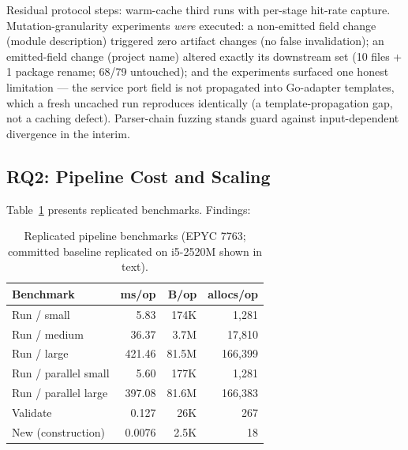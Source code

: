 \documentclass[sigconf,nonacm]{acmart}
\begin{document}
Residual protocol steps: warm-cache third runs with per-stage hit-rate capture. Mutation-granularity experiments \emph{were} executed: a non-emitted field change (module description) triggered zero artifact changes (no false invalidation); an emitted-field change (project name) altered exactly its downstream set (10 files + 1 package rename; 68/79 untouched); and the experiments surfaced one honest limitation --- the service port field is not propagated into Go-adapter templates, which a fresh uncached run reproduces identically (a template-propagation gap, not a caching defect). Parser-chain fuzzing stands guard against input-dependent divergence in the interim.

\subsection{RQ2: Pipeline Cost and Scaling}
Table~\ref{tab:bench} presents replicated benchmarks. Findings:

\begin{table}[t]
\centering
\caption{Replicated pipeline benchmarks (EPYC 7763; committed baseline replicated on i5-2520M shown in text).}
\label{tab:bench}
\small
\begin{tabular}{@{}lrrr@{}}
\toprule
\textbf{Benchmark} & \textbf{ms/op} & \textbf{B/op} & \textbf{allocs/op}\\
\midrule
Run / small & 5.83 & 174K & 1{,}281\\
Run / medium & 36.37 & 3.7M & 17{,}810\\
Run / large & 421.46 & 81.5M & 166{,}399\\
Run / parallel small & 5.60 & 177K & 1{,}281\\
Run / parallel large & 397.08 & 81.6M & 166{,}383\\
Validate & 0.127 & 26K & 267\\
New (construction) & 0.0076 & 2.5K & 18\\
\bottomrule
\end{tabular}
\end{table}
\end{document}
